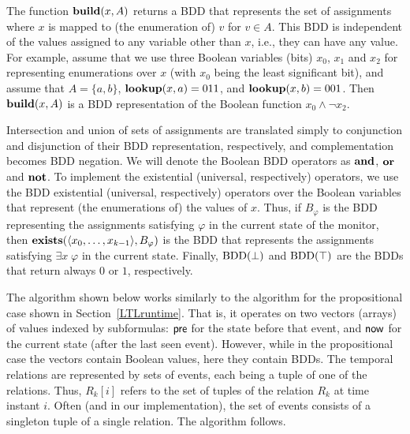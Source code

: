 The function $\mathbf{build} (x, A)$ returns
a BDD that represents the set of assignments where $x$ is mapped to 
(the enumeration of) $v$ for
$v \in A$. This BDD is independent
of the values assigned to any variable
other than $x$, i.e., they can have any value.
For example, assume that we use three Boolean variables (bits) $x_0$, $x_1$ and $x_2$
for representing enumerations over $x$ (with $x_0$ being the least significant bit), and
assume that $A = \{ a , b \}$, 
$\mathbf{lookup} ( x, a ) = 011$, and $\mathbf{lookup} ( x , b ) = 001$.
Then $\mathbf{build} ( x , A )$ is a BDD representation of the Boolean function 
$x_0 \wedge \neg x_2$. 

Intersection and union of sets of assignments are translated simply
to conjunction and disjunction of their BDD representation,
respectively, and complementation
becomes BDD negation. We will denote
the Boolean BDD operators as $\mathbf{and}$, $\mathbf{or}$ and $\mathbf{not}$.
To implement the existential (universal, respectively) operators, 
we use the BDD existential (universal, respectively) operators over
the Boolean variables that represent (the enumerations of) the values of $x$. 
Thus, if $B_{\varphi}$ is the BDD representing
the assignments satisfying $\varphi$ in
the current state of the monitor, then 
$\mathbf{exists} (\langle x_0,\ldots,x_{k-1} \rangle, B_{\varphi})$
is the BDD that represents the assignments satisfying $\exists x \; \varphi$ in the current
state.
Finally, $\mathrm{BDD}(\bot)$ and $\mathrm{BDD}(\top)$  are the BDDs that return always
$0$ or $1$, respectively.


The algorithm shown below works similarly to the algorithm for the 
propositional case shown in
Section~\ref{LTLruntime}. That is,
it operates on two vectors (arrays) of values indexed by subformulas: 
$\mathsf{pre}$ for the state before that event, and
$\mathsf{now}$ for the current
state (after the last seen event).
However, while in the propositional case the vectors contain Boolean values, here
they contain BDDs. The temporal relations are
represented by
sets of events, each being a tuple of one of the relations. Thus, $R_k [ i ]$ refers to the set
of tuples of the relation $R_k$ at time instant $i$. Often (and in our implementation), the set of events consists of a singleton tuple of a single relation.
The algorithm follows.

